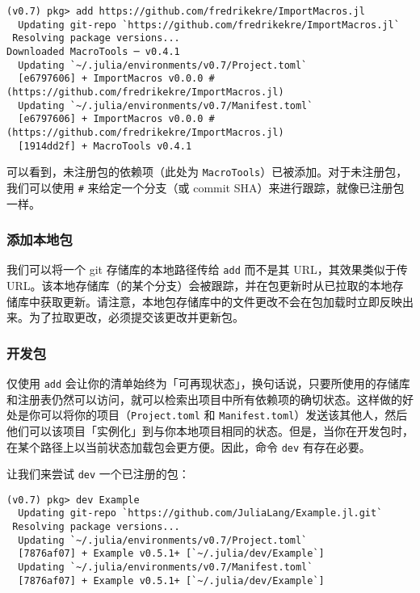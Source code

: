 \begin{lstlisting}
(v0.7) pkg> add https://github.com/fredrikekre/ImportMacros.jl
  Updating git-repo `https://github.com/fredrikekre/ImportMacros.jl`
 Resolving package versions...
Downloaded MacroTools ─ v0.4.1
  Updating `~/.julia/environments/v0.7/Project.toml`
  [e6797606] + ImportMacros v0.0.0 # (https://github.com/fredrikekre/ImportMacros.jl)
  Updating `~/.julia/environments/v0.7/Manifest.toml`
  [e6797606] + ImportMacros v0.0.0 # (https://github.com/fredrikekre/ImportMacros.jl)
  [1914dd2f] + MacroTools v0.4.1
\end{lstlisting}



可以看到，未注册包的依赖项（此处为 \texttt{MacroTools}）已被添加。对于未注册包，我们可以使用 \texttt{\#} 来给定一个分支（或 commit SHA）来进行跟踪，就像已注册包一样。



\hypertarget{7534124019894702517}{}


\subsubsection{添加本地包}



我们可以将一个 git 存储库的本地路径传给 \texttt{add} 而不是其 URL，其效果类似于传 URL。该本地存储库（的某个分支）会被跟踪，并在包更新时从已拉取的本地存储库中获取更新。请注意，本地包存储库中的文件更改不会在包加载时立即反映出来。为了拉取更改，必须提交该更改并更新包。



\hypertarget{14425308659963754723}{}


\subsubsection{开发包}



仅使用 \texttt{add} 会让你的清单始终为「可再现状态」，换句话说，只要所使用的存储库和注册表仍然可以访问，就可以检索出项目中所有依赖项的确切状态。这样做的好处是你可以将你的项目（\texttt{Project.toml} 和 \texttt{Manifest.toml}）发送该其他人，然后他们可以该项目「实例化」到与你本地项目相同的状态。但是，当你在开发包时，在某个路径上以当前状态加载包会更方便。因此，命令 \texttt{dev} 有存在必要。



让我们来尝试 \texttt{dev} 一个已注册的包：




\begin{lstlisting}
(v0.7) pkg> dev Example
  Updating git-repo `https://github.com/JuliaLang/Example.jl.git`
 Resolving package versions...
  Updating `~/.julia/environments/v0.7/Project.toml`
  [7876af07] + Example v0.5.1+ [`~/.julia/dev/Example`]
  Updating `~/.julia/environments/v0.7/Manifest.toml`
  [7876af07] + Example v0.5.1+ [`~/.julia/dev/Example`]
\end{lstlisting}



